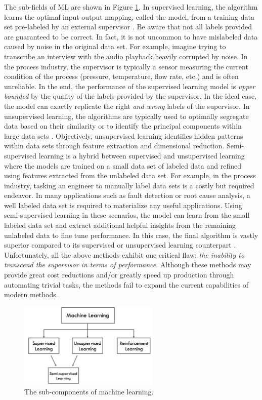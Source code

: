 The sub-fields of ML are shown in Figure \ref{fig:MLGoals}.  In supervised learning, the algorithm learns the optimal input-output mapping, called the model, from a training data set pre-labeled by an external supervisor \cite{sutton}.  Be aware that not all labels provided are guaranteed to be correct. In fact, it is not uncommon to  have mislabeled data caused by noise in the original data set. For example, imagine trying to transcribe an interview with the audio playback heavily corrupted by noise.  In the process industry, the supervisor is typically a sensor measuring the current condition of the process (pressure, temperature, flow rate, etc.) and is often unreliable. In the end, the performance of the supervised learning model is \textit{upper bounded} by the quality of the labels provided by the supervisor.  In the ideal case, the model can exactly replicate the right \textit{and wrong} labels of the supervisor. In unsupervised learning, the algorithms are typically used to optimally segregate data based on their similarity or to identify the principal components within large data sets \cite{Hinton, sutton}.  Objectively, unsupervised learning identifies hidden patterns within data sets through feature extraction and dimensional reduction. Semi-supervised learning is a hybrid between supervised and unsupervised learning where the models are trained on a small data set of labeled data and refined using features extracted from the unlabeled data set. For example, in the process industry, tasking an engineer to manually label data sets is a costly but required endeavor.  In many applications such as fault detection or root cause analysis, a well labeled data set is required to materialize any useful applications.  Using semi-supervised learning in these scenarios, the model can learn from the small labeled data set and extract additional helpful insights from the remaining unlabeled data to fine tune performance.  In this case, the final algorithm is vastly superior compared to its supervised or unsupervised learning counterpart \cite{machine_learning}.  Unfortunately, all the above methods exhibit one critical flaw: \textit{the inability to transcend the supervisor in terms of performance}. Although these methods may provide great cost reductions and/or greatly speed up production through automating trivial tasks, the methods fail to expand the current capabilities of modern methods.

\begin{figure}[H]
    \centering
    \includegraphics[width=0.6\textwidth]{images/ch1/MLGoals.jpeg}
    \caption{The sub-components of machine learning.}
    \label{fig:MLGoals}
\end{figure}   

